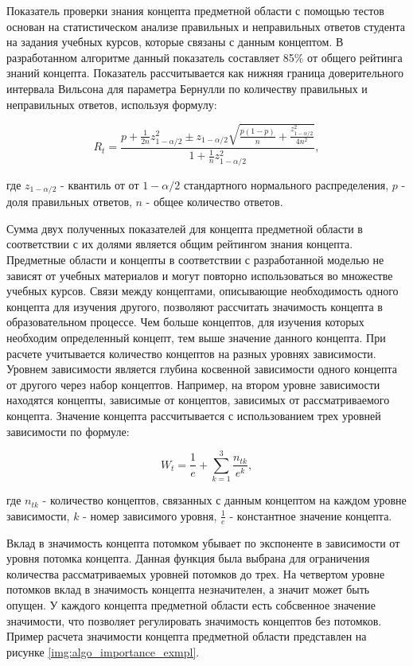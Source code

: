 Показатель проверки знания концепта предметной области с помощью тестов основан на статистическом анализе правильных и неправильных ответов студента на задания учебных курсов, которые связаны с данным концептом. В разработанном алгоритме данный показатель составляет 85\% от общего рейтинга знаний концепта. Показатель рассчитывается как нижняя граница доверительного интервала Вильсона для параметра Бернулли по количеству правильных и неправильных ответов, используя формулу:

$$
    R_t = \frac{p+\frac{1}{2n}z_{1-\alpha/2}^2 \pm z_{1-\alpha/2}\sqrt{\frac{p(1-p)}{n}+\frac{z_{1-\alpha/2}^2}{4n^2}}{} }{1+\frac{1}{n}z_{1-\alpha/2}^2},
$$

где \(z_{1-\alpha/2}\) - квантиль от от \(1-\alpha/2\) стандартного нормального распределения, \(p\) - доля правильных ответов, \(n\) - общее количество ответов. 

Сумма двух полученных показателей для концепта предметной области в соответствии с их долями является общим рейтингом знания концепта. Предметные области и концепты в соответствии с разработанной моделью не зависят от учебных материалов и могут повторно использоваться во множестве учебных курсов. Связи между концептами, описывающие необходимость одного концепта для изучения другого, позволяют рассчитать значимость концепта в образовательном процессе. Чем больше концептов, для изучения которых необходим определенный концепт, тем выше значение данного концепта. При расчете учитывается количество концептов на разных уровнях зависимости. Уровнем зависимости является глубина косвенной зависимости одного концепта от другого через набор концептов. Например, на втором уровне зависимости находятся концепты, зависимые от концептов, зависимых от рассматриваемого концепта. Значение концепта рассчитывается с использованием трех уровней зависимости по формуле: 

$$
    W_t = \frac{1}{e}+\sum_{k=1}^{3}\frac{n_{tk}}{e^k}, 
$$

где \(n_{tk}\) - количество концептов, связанных с данным концептом на каждом уровне зависимости, \(k\) - номер зависимого уровня, \( \frac{1}{e} \) - константное значение концепта. 

Вклад в значимость концепта потомком убывает по экспоненте в зависимости от уровня потомка концепта. Данная функция была выбрана для ограничения количества рассматриваемых уровней потомков до трех. На четвертом уровне потомков вклад в значимость концепта незначителен, а значит может быть опущен. У каждого концепта предметной области есть собсвенное значение значимости, что позволяет регулировать значимость концептов без потомков. Пример расчета значимости концепта предметной области представлен на рисунке \ref{img:algo_importance_exmpl}.

